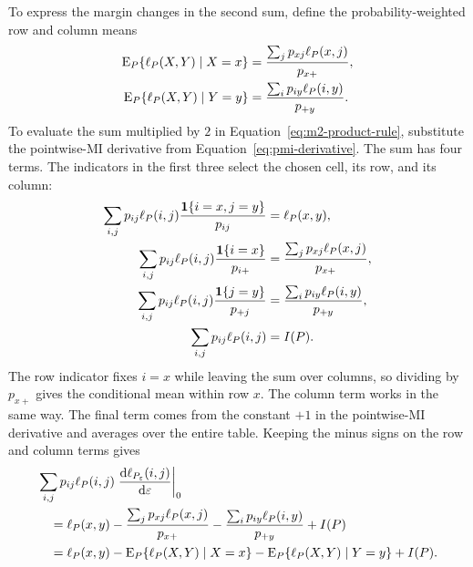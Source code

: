 To express the margin changes in the second sum, define the
probability-weighted row and column means
\begin{align}
  \operatorname{E}_P\{\ell_P(X,Y)\mid X=x\}
  &=\frac{\sum_j p_{xj}\ell_P(x,j)}{p_{x+}},\\
  \operatorname{E}_P\{\ell_P(X,Y)\mid Y=y\}
  &=\frac{\sum_i p_{iy}\ell_P(i,y)}{p_{+y}}.
\end{align}
To evaluate the sum multiplied by \(2\) in
Equation~\eqref{eq:m2-product-rule}, substitute the pointwise-MI derivative
from Equation~\eqref{eq:pmi-derivative}. The sum has four terms. The
indicators in the first three select the chosen cell, its row, and its column:
\begin{align*}
  \sum_{i,j}p_{ij}\ell_P(i,j)
  \frac{\mathbf 1\{i=x,j=y\}}{p_{ij}}
  &=\ell_P(x,y),\\
  \sum_{i,j}p_{ij}\ell_P(i,j)
  \frac{\mathbf 1\{i=x\}}{p_{i+}}
  &=\frac{\sum_j p_{xj}\ell_P(x,j)}{p_{x+}},\\
  \sum_{i,j}p_{ij}\ell_P(i,j)
  \frac{\mathbf 1\{j=y\}}{p_{+j}}
  &=\frac{\sum_i p_{iy}\ell_P(i,y)}{p_{+y}},\\
  \sum_{i,j}p_{ij}\ell_P(i,j)&=I(P).
\end{align*}
The row indicator fixes \(i=x\) while leaving the sum over columns, so
dividing by \(p_{x+}\) gives the conditional mean within row \(x\). The column
term works in the same way. The final term comes from the constant \(+1\)
in the pointwise-MI derivative and averages over the entire table. Keeping
the minus signs on the row and column terms gives
\begin{align}
  &\sum_{i,j}p_{ij}\ell_P(i,j)
  \left.\frac{\mathrm d\ell_{P_\varepsilon}(i,j)}
  {\mathrm d\varepsilon}\right|_{0}
  \notag\\
  &\quad=
  \ell_P(x,y)
  -\frac{\sum_j p_{xj}\ell_P(x,j)}{p_{x+}}
  -\frac{\sum_i p_{iy}\ell_P(i,y)}{p_{+y}}
  +I(P)
  \notag\\
  &\quad=
  \ell_P(x,y)
  -\operatorname{E}_P\{\ell_P(X,Y)\mid X=x\}
  -\operatorname{E}_P\{\ell_P(X,Y)\mid Y=y\}
  +I(P).
  \label{eq:m2-score-term}
\end{align}

